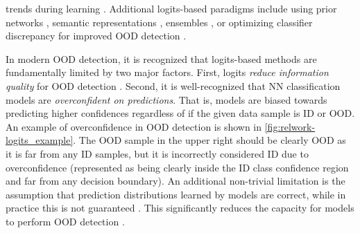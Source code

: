 trends during learning \cite{shama2019detecting,sun2022dice,canevaroadvancing,kalantransfer}. Additional logits-based paradigms include using prior networks \cite{malinin2019ensemble}, semantic representations \cite{shalev2018out}, ensembles \cite{yang2021ensemble,xu2024outofdistribution}, or optimizing classifier discrepancy \cite{yu2019unsupervised} for improved OOD detection \cite{scheirer2012toward,smith1990extreme}.

In modern OOD detection, it is recognized that logits-based methods are fundamentally limited by two major factors. First, logits \emph{reduce information quality} for OOD detection \cite{lee2018simple}. Second, it is well-recognized that NN classification models are \emph{overconfident on predictions}. That is, models are biased towards predicting higher confidences regardless of if the given data sample is ID or OOD. An example of overconfidence in OOD detection is shown in \ref{fig:relwork-logits_example}. The OOD sample in the upper right should be clearly OOD as it is far from any ID samples, but it is incorrectly considered ID due to overconfidence (represented as being clearly inside the ID class confidence region and far from any decision boundary). An additional non-trivial limitation is the assumption that prediction distributions learned by models are correct, while in practice this is not guaranteed \cite{liu2024rethinking,miao2024long}. This significantly reduces the capacity for models to perform OOD detection \cite{nguyen2015deep,hendrycks2017baseline,wei2022mitigating,lee2018simple,sun2021react,paullada2021data}.



